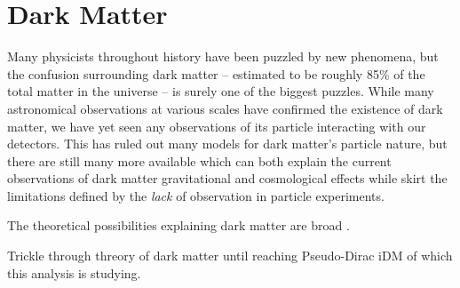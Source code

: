 \chapter{Dark Matter}
\label{chapter:dm}

Many physicists throughout history have been puzzled by new phenomena, but the
confusion surrounding dark matter -- estimated to be roughly 85\% of the total
matter in the universe -- is surely one of the biggest puzzles. While many
astronomical observations at various scales have confirmed the existence of
dark matter, we have yet seen any observations of its particle interacting
with our detectors. This has ruled out many models for dark matter's particle
nature, but there are still many more available which can both explain the
current observations of dark matter gravitational and cosmological effects
while skirt the limitations defined by the \emph{lack} of observation in
particle experiments.

The theoretical possibilities explaining dark matter are broad \cite{darksectors-2016}.

Trickle through threory of dark matter until reaching Pseudo-Dirac iDM of which
this analysis is studying.

